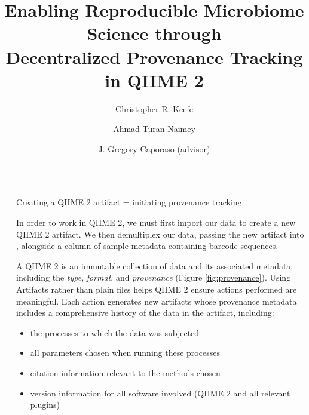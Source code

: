 \documentclass[final]{beamer}
\title{Enabling Reproducible Microbiome Science through \\ Decentralized Provenance Tracking in QIIME 2}
\author{Christopher R. Keefe \and Ahmad Turan Naimey \and J. Gregory Caporaso (advisor)}
\institute[shortinst]{The Pathogen and Microbiome Institute at Northern Arizona University}
\newlength{\sepwidth}
\newlength{\colwidth}
\newcommand{\separatorcolumn}{\begin{column}{\sepwidth}\end{column}}
\begin{document}
\begin{frame}[t]
\begin{columns}[t]
\separatorcolumn

\begin{column}{\colwidth}


  \begin{block}{Creating a QIIME 2 artifact = initiating provenance tracking}

   In order to work in QIIME 2, we must first import our data to create a new
   QIIME 2 artifact. We then demultiplex our data, passing the new artifact
   into , alongside a column of sample metadata containing
   barcode sequences.

   \begin{tcolorbox}
   [width=\textwidth, colframe=blue]
   {A QIIME 2  is an immutable collection of data and its associated
           metadata, including the \textit{type}, \textit{format}, and \textit{provenance} (Figure \ref{fig:provenance}).
   Using Artifacts rather than plain files helps QIIME 2 ensure actions
   performed are meaningful. Each action generates new artifacts whose
   provenance metadata includes a comprehensive history of the data in the
   artifact, including:}
    \begin{itemize}
      \item {the processes to which the data was subjected}
      \item {all parameters chosen when running these processes}
      \item {citation information relevant to the methods chosen}
      \item {version information for all software involved (QIIME 2 and all relevant plugins)}
    \end{itemize}
    \end{tcolorbox}
  \end{block}


\end{column}
\end{columns}
\end{frame}
\end{document}
